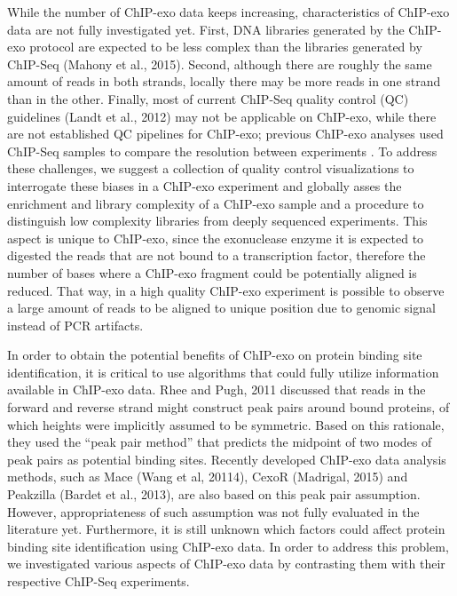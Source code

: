 \documentclass{bmcart}
\begin{document}
While the number of ChIP-exo data keeps increasing, characteristics of
ChIP-exo data are not fully investigated yet. First, DNA libraries
generated by the ChIP-exo protocol are expected to be less complex than the
libraries generated by ChIP-Seq (Mahony et al.,
2015\nocite{exo_review}). Second, although there are roughly the same
amount of reads in both strands, locally there may be more reads in
one strand than in the other. Finally, most of current ChIP-Seq
quality control (QC) guidelines (Landt et al., 2012\nocite{encode_qc})
may not be applicable on ChIP-exo, while there are not established QC
pipelines for ChIP-exo; previous ChIP-exo analyses used ChIP-Seq
samples to compare the resolution between experiments
\cite{exo1,exoillumina,exo2}. To address these challenges, we suggest
a collection of quality control visualizations to interrogate these
biases in a ChIP-exo experiment and globally asses the enrichment and
library complexity of a ChIP-exo sample and a procedure to distinguish
low complexity libraries from deeply sequenced experiments. This
aspect is unique to ChIP-exo, since the exonuclease enzyme it is
expected to digested the reads that are not bound to a transcription
factor, therefore the number of bases where a ChIP-exo fragment could
be potentially aligned is reduced. That way, in a high quality
ChIP-exo experiment is possible to observe a large amount of reads to
be aligned to unique position due to genomic signal instead of PCR
artifacts.

In order to obtain the potential benefits of ChIP-exo on protein
binding site identification, it is critical to use algorithms that
could fully utilize information available in ChIP-exo data. Rhee and
Pugh, 2011 \nocite{exo1} discussed that reads in the forward and reverse
strand might construct peak pairs around bound proteins, of which
heights were implicitly assumed to be symmetric. Based on this
rationale, they used the ``peak pair method'' that predicts the
midpoint of two modes of peak pairs as potential binding
sites. Recently developed ChIP-exo data analysis methods, such as Mace
(Wang et al, 20114\nocite{mace}), CexoR (Madrigal, 2015\nocite{cexor})
and Peakzilla (Bardet et al., 2013\nocite{peakzilla}), are also based
on this peak pair assumption. However, appropriateness of such
assumption was not fully evaluated in the literature yet. Furthermore,
it is still unknown which factors could affect protein binding site
identification using ChIP-exo data. In order to address this problem,
we investigated various aspects of ChIP-exo data by contrasting them
with their respective ChIP-Seq experiments.
\end{document}
